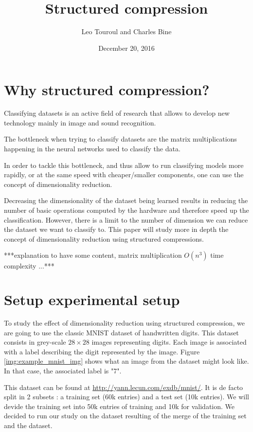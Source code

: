 \documentclass[11pt,a4paper]{article}
\author{Leo Touroul and Charles Bine}
\title{Structured compression}
\date{December 20, 2016}
\begin{document}
	\maketitle

	\section{Why structured compression?}
	Classifying datasets is an active field of research that allows to develop new technology mainly in image and sound recognition.
	
	
	The bottleneck when trying to classify datasets are the matrix multiplications happening in the neural networks used to classify the data.
	
	
	In order to tackle this bottleneck, and thus allow to run classifying models more rapidly, or at the same speed with cheaper/smaller components, one can use the concept of dimensionality reduction.
	
	
	Decreasing the dimensionality of the dataset being learned results in reducing the number of basic operations computed by the hardware and therefore speed up the classification.
	However, there is a limit to the number of dimension we can reduce the dataset we want to classify to. This paper will study more in depth the concept of dimensionality reduction using structured compressions.
	
	
	***explanation to have some content, matrix multiplication $O(n^3)$ time complexity ...***		
	
	\section{Setup experimental setup}
	To study the effect of dimensionality reduction using structured compression, we are going to use the classic MNIST dataset of handwritten digits. This dataset consists in grey-scale $28 \times 28$ images representing digits. Each image is associated with a label describing the digit represented by the image. Figure \ref{img:example_mnist_img} shows what an image from the dataset might look like. In that case, the associated label is "7".
	
	
	This dataset can be found at \url{http://yann.lecun.com/exdb/mnist/}. It is de facto split in 2 subsets : a training set (60k entries) and a test set (10k entries). We will devide the training set into 50k entries of training and 10k for validation. We decided to run our study on the dataset resulting of the merge of the training set and the dataset.
	
\end{document}

